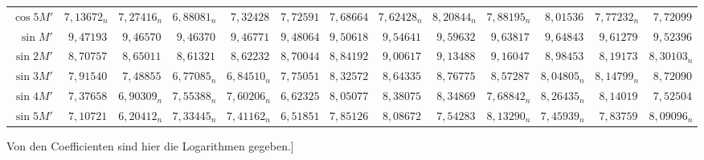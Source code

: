 \begin{landscape}
\begin{center}
\begin{tabular}{@{}r|*{11}{r|}r@{}}
\(\cos 5M'\) & \(7{,}13672_n\) & \(7{,}27416_n\) & \(6{,}88081_n\) & \(7{,}32428\) & \(7{,}72591\) & \(7{,}68664\) & \(7{,}62428_n\) & \(8{,}20844_n\) & \(7{,}88195_n\) & \(8{,}01536\) & \(7{,}77232_n\) & \(7{,}72099\)\\[.6em]
\(\sin M'\) & \(9{,}47193\) & \(9{,}46570\) & \(9{,}46370\) & \(9{,}46771\) & \(9{,}48064\) & \(9{,}50618\) & \(9{,}54641\) & \(9{,}59632\) & \(9{,}63817\) & \(9{,}64843\) & \(9{,}61279\) & \(9{,}52396\)\\
\(\sin 2M'\) & \(8{,}70757\) & \(8{,}65011\) & \(8{,}61321\) & \(8{,}62232\) & \(8{,}70044\) & \(8{,}84192\) & \(9{,}00617\) & \(9{,}13488\) & \(9{,}16047\) & \(8{,}98453\) & \(8{,}19173\) & \(8{,}30103_n\)\\
\(\sin 3M'\) & \(7{,}91540\) & \(7{,}48855\) & \(6{,}77085_n\) & \(6{,}84510_n\) & \(7{,}75051\) & \(8{,}32572\) & \(8{,}64335\) & \(8{,}76775\) & \(8{,}57287\) & \(8{,}04805_n\) & \(8{,}14799_n\) & \(8{,}72090\)\\
\(\sin 4M'\) & \(7{,}37658\) & \(6{,}90309_n\) & \(7{,}55388_n\) & \(7{,}60206_n\) & \(6{,}62325\) & \(8{,}05077\) & \(8{,}38075\) & \(8{,}34869\) & \(7{,}68842_n\) & \(8{,}26435_n\) & \(8{,}14019\) & \(7{,}52504\)\\
\(\sin 5M'\) & \(7{,}10721\) & \(6{,}20412_n\) & \(7{,}33445_n\) & \(7{,}41162_n\) & \(6{,}51851\) & \(7{,}85126\) & \(8{,}08672\) & \(7{,}54283\) & \(8{,}13290_n\) & \(7{,}45939_n\) & \(7{,}83759\) & \(8{,}09096_n\)\\
\end{tabular}
\end{center}
\par\noindent\hspace*{\parindent}Von den Coefficienten sind hier die Logarithmen gegeben.]
\endgroup
\end{landscape}
\clearpage
\endgroup

